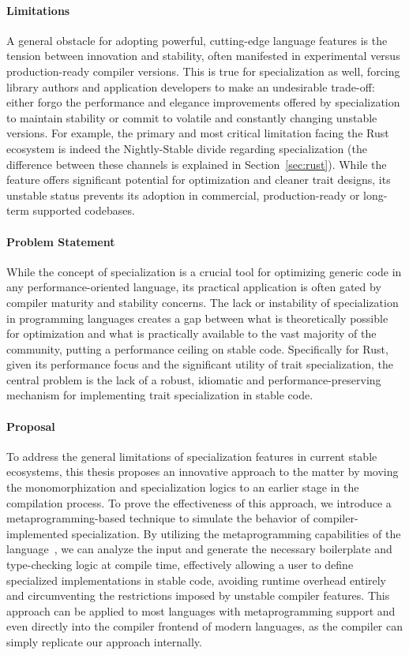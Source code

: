 \paragraph{Limitations}
A general obstacle for adopting powerful, cutting-edge language features is the tension between innovation and stability, often manifested in experimental versus production-ready compiler versions.
This is true for specialization as well, forcing library authors and application developers to make an undesirable trade-off: either forgo the performance and elegance improvements offered by specialization to maintain stability or commit to volatile and constantly changing unstable versions.
For example, the primary and most critical limitation facing the Rust ecosystem is indeed the Nightly-Stable divide regarding specialization (the difference between these channels is explained in Section~\ref{sec:rust}).
While the feature offers significant potential for optimization and cleaner trait designs, its unstable status prevents its adoption in commercial, production-ready or long-term supported codebases.

\paragraph{Problem Statement}
While the concept of specialization is a crucial tool for optimizing generic code in any performance-oriented language, its practical application is often gated by compiler maturity and stability concerns.
The lack or instability of specialization in programming languages creates a gap between what is theoretically possible for optimization and what is practically available to the vast majority of the community, putting a performance ceiling on stable code.
Specifically for Rust, given its performance focus and the significant utility of trait specialization, the central problem is the lack of a robust, idiomatic and performance-preserving mechanism for implementing trait specialization in stable code.

\paragraph{Proposal}
To address the general limitations of specialization features in current stable ecosystems, this thesis proposes an innovative approach to the matter by moving the monomorphization and specialization logics to an earlier stage in the compilation process.
To prove the effectiveness of this approach, we introduce a metaprogramming-based technique to simulate the behavior of compiler-implemented specialization.
By utilizing the metaprogramming capabilities of the language~\cite{MetaprogrammingLanguagesSurvey19}, we can analyze the input and generate the necessary boilerplate and type-checking logic at compile time, effectively allowing a user to define specialized implementations in stable code, avoiding runtime overhead entirely and circumventing the restrictions imposed by unstable compiler features.
This approach can be applied to most languages with metaprogramming support and even directly into the compiler frontend of modern languages, as the compiler can simply replicate our approach internally.

